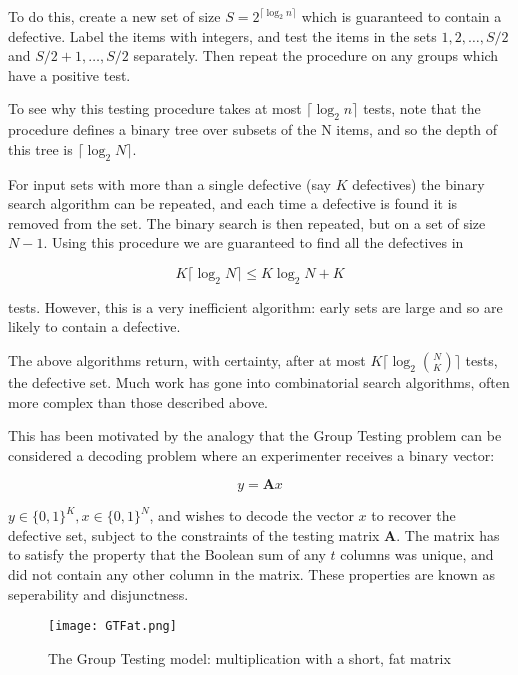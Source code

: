 To do this, create a new set of size \(S = 2^{\lceil{\log_2{n}}\rceil}\) which is guaranteed to contain a defective. Label the items with integers, and test the items in the sets \({1,2,\ldots ,S/2}\) and \({S/2 + 1,\ldots ,S/2}\) separately. Then repeat the procedure on any groups which have a positive test. 

To see why this testing procedure takes at most \(\lceil{\log_2{n}}\rceil\) tests, note that the procedure defines a binary tree over subsets of the N items, and so the depth of this tree is \(\lceil{\log_2{N}}\rceil\).

For input sets with more than a single defective (say \(K\) defectives) the binary search algorithm can be repeated, and each time a defective is found it is removed from the set. The binary search is then repeated, but on a set of size \(N-1\). Using this procedure we are guaranteed to find all the defectives in 

\begin{equation}
K \lceil \log_2{N} \rceil \leq K\log_2{N} + K
\end{equation}

tests. However, this is a very inefficient algorithm: early sets are large and so are likely to contain a defective.

The above algorithms return, with certainty, after at most \(K\lceil \log_2{N\choose K}\rceil\) tests, the defective set. Much work has gone into combinatorial search algorithms, often more complex than those described above. 

This has been motivated by the analogy that the Group Testing problem can be considered a decoding problem where an experimenter receives a binary vector: 

\begin{equation}
y = \textbf{A}x
\end{equation}

\(y \in \{0,1\}^K, x \in \{0,1\}^N\), and wishes to decode the vector \(x\) to recover the defective set, subject to the constraints of the testing matrix \(\textbf{A}\). The matrix has to satisfy the property that the Boolean sum of any \(t\) columns was unique, and did not contain any other column in the matrix. These properties are known as seperability and disjunctness. 

\begin{figure*}[h]
\centering
\texttt{[image: GTFat.png]}
\caption{The Group Testing model: multiplication with a short, fat matrix \cite{atia2}}
\label{bayesiancs}
\end{figure*}


